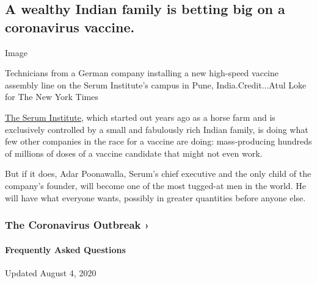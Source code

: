 \hypertarget{a-wealthy-indian-family-is-betting-big-on-a-coronavirus-vaccine}{%
\subsection{A wealthy Indian family is betting big on a coronavirus
vaccine.}\label{a-wealthy-indian-family-is-betting-big-on-a-coronavirus-vaccine}}

Image

Technicians from a German company installing a new high-speed vaccine
assembly line on the Serum Institute's campus in Pune,
India.Credit...Atul Loke for The New York Times

\href{https://www.seruminstitute.com/index.php}{The Serum Institute},
which started out years ago as a horse farm and is exclusively
controlled by a small and fabulously rich Indian family, is doing what
few other companies in the race for a vaccine are doing: mass-producing
hundreds of millions of doses of a vaccine candidate that might not even
work.

But if it does, Adar Poonawalla, Serum's chief executive and the only
child of the company's founder, will become one of the most tugged-at
men in the world. He will have what everyone wants, possibly in greater
quantities before anyone else.

\href{https://www.nytimes.com/news-event/coronavirus?action=click\&pgtype=Article\&state=default\&region=MAIN_CONTENT_3\&context=storylines_faq}{}

\hypertarget{the-coronavirus-outbreak-}{%
\subsubsection{The Coronavirus Outbreak
›}\label{the-coronavirus-outbreak-}}

\hypertarget{frequently-asked-questions}{%
\paragraph{Frequently Asked
Questions}\label{frequently-asked-questions}}

Updated August 4, 2020

